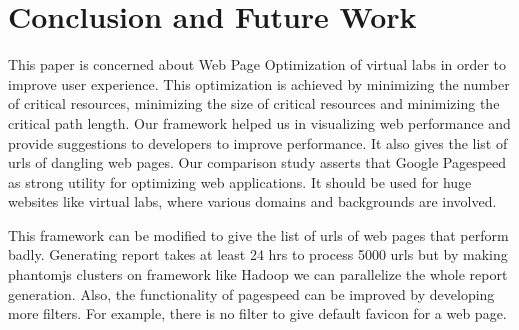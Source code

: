 \documentclass[conference]{IEEEtran}
\begin{document}
\section{Conclusion and Future Work}
\label{sec-7}
This paper is concerned about Web Page Optimization of virtual labs in order to improve user experience.
This optimization is achieved by minimizing the number of critical resources, minimizing the size of
critical resources and minimizing the critical path length. Our framework helped us in visualizing web performance and
provide suggestions to developers to improve performance. It also gives the list of urls of dangling web pages.
Our comparison study asserts that Google Pagespeed as strong utility for optimizing web applications.
It should be used for huge websites like virtual labs, where various domains and backgrounds are involved.
 
This framework can be modified to give the list of urls of web pages that perform badly.
Generating report takes at least 24 hrs to process 5000 urls but by
making phantomjs clusters on framework like Hadoop we can parallelize the whole report generation.
Also, the functionality of pagespeed can be improved by developing more filters. For example, there is no filter to give default
favicon for a web page.
\end{document}
